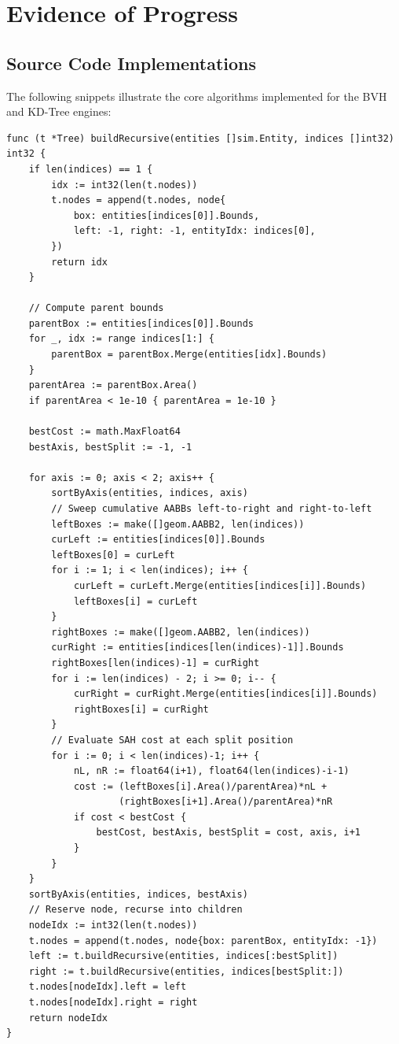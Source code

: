\documentclass[12pt]{article}
\begin{document}
\section{Evidence of Progress}

\subsection{Source Code Implementations}

The following snippets illustrate the core algorithms implemented for the BVH and KD-Tree engines:

\begin{lstlisting}[style=gostyle, caption={SAH-based BVH construction with sweep evaluation (\texttt{pkg/bvh/bvh.go}, excerpt)}]
func (t *Tree) buildRecursive(entities []sim.Entity, indices []int32) int32 {
    if len(indices) == 1 {
        idx := int32(len(t.nodes))
        t.nodes = append(t.nodes, node{
            box: entities[indices[0]].Bounds,
            left: -1, right: -1, entityIdx: indices[0],
        })
        return idx
    }

    // Compute parent bounds
    parentBox := entities[indices[0]].Bounds
    for _, idx := range indices[1:] {
        parentBox = parentBox.Merge(entities[idx].Bounds)
    }
    parentArea := parentBox.Area()
    if parentArea < 1e-10 { parentArea = 1e-10 }

    bestCost := math.MaxFloat64
    bestAxis, bestSplit := -1, -1

    for axis := 0; axis < 2; axis++ {
        sortByAxis(entities, indices, axis)
        // Sweep cumulative AABBs left-to-right and right-to-left
        leftBoxes := make([]geom.AABB2, len(indices))
        curLeft := entities[indices[0]].Bounds
        leftBoxes[0] = curLeft
        for i := 1; i < len(indices); i++ {
            curLeft = curLeft.Merge(entities[indices[i]].Bounds)
            leftBoxes[i] = curLeft
        }
        rightBoxes := make([]geom.AABB2, len(indices))
        curRight := entities[indices[len(indices)-1]].Bounds
        rightBoxes[len(indices)-1] = curRight
        for i := len(indices) - 2; i >= 0; i-- {
            curRight = curRight.Merge(entities[indices[i]].Bounds)
            rightBoxes[i] = curRight
        }
        // Evaluate SAH cost at each split position
        for i := 0; i < len(indices)-1; i++ {
            nL, nR := float64(i+1), float64(len(indices)-i-1)
            cost := (leftBoxes[i].Area()/parentArea)*nL +
                    (rightBoxes[i+1].Area()/parentArea)*nR
            if cost < bestCost {
                bestCost, bestAxis, bestSplit = cost, axis, i+1
            }
        }
    }
    sortByAxis(entities, indices, bestAxis)
    // Reserve node, recurse into children
    nodeIdx := int32(len(t.nodes))
    t.nodes = append(t.nodes, node{box: parentBox, entityIdx: -1})
    left := t.buildRecursive(entities, indices[:bestSplit])
    right := t.buildRecursive(entities, indices[bestSplit:])
    t.nodes[nodeIdx].left = left
    t.nodes[nodeIdx].right = right
    return nodeIdx
}
\end{lstlisting}
\end{document}
